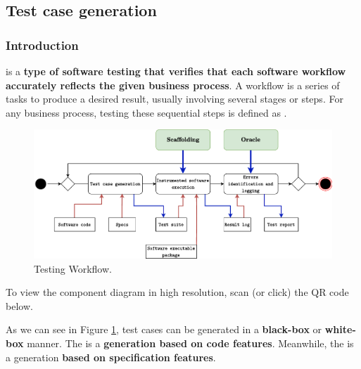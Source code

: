 \subsection{Test case generation}

\subsubsection{Introduction}

 is a \textbf{type of software testing that verifies that each software workflow accurately reflects the given business process}. A workflow is a series of tasks to produce a desired result, usually involving several stages or steps. For any business process, testing these sequential steps is defined as .

\begin{figure}[!htp]
    \centering
    \includegraphics[width=\textwidth]{img/testing-overflow.pdf}
    \caption{Testing Workflow.}
    \label{fig: Testing Workflow}
\end{figure}

\noindent
To view the component diagram in high resolution, scan (or click) the QR code below.
\begin{center}
\end{center}

\noindent
As we can see in Figure \ref{fig: Testing Workflow}, test cases can be generated in a \textbf{black-box} or \textbf{white-box} manner. The  is a \textbf{generation based on code features}. Meanwhile, the  is a generation \textbf{based on specification features}.


